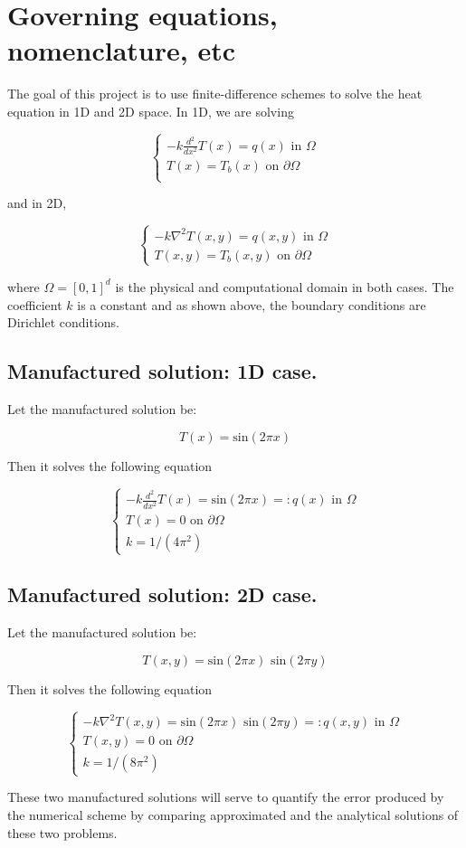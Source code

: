 \section{Governing equations, nomenclature, etc}

The goal of this project is to use finite-difference schemes to solve the heat equation in 1D and 2D space. In 1D, we are solving

$$
\begin{cases}
    -k \frac{d^2}{dx^2}T(x) = q(x) \text{ in } \Omega \\
    T(x) = T_b(x) \text{ on } \partial\Omega \\
\end{cases} 
$$

and in 2D,

$$
\begin{cases}
    -k \nabla^2 T(x,y) = q(x,y) \text{ in } \Omega \\
    T(x,y) = T_b(x,y) \text{ on } \partial\Omega
\end{cases} 
$$

where $\Omega = [0,1]^d$ is the physical and computational domain in both cases. The coefficient $k$ is a constant and as shown above, the boundary conditions are Dirichlet conditions.

\subsection{Manufactured solution: 1D case.}
Let the manufactured solution be: 

\begin{equation*}
    T(x) = \text{sin}(2 \pi x)
\end{equation*}

Then it solves the following equation

$$
\begin{cases}
    -k \frac{d^2}{dx^2}T(x) = \text{sin}(2\pi x) =: q(x)\text{ in } \Omega \\
    T(x) = 0 \text{ on } \partial\Omega \\
    k = 1/(4\pi^2)
\end{cases} 
$$

\subsection{Manufactured solution: 2D case.}
Let the manufactured solution be: 

\begin{equation*}
    T(x,y) = \text{sin}(2 \pi x)\text{ sin}(2 \pi y)
\end{equation*}

Then it solves the following equation

$$
\begin{cases}
    -k \nabla^2 T(x,y) = \text{sin}(2 \pi x)\text{ sin}(2 \pi y) =: q(x,y)\text{ in } \Omega \\
    T(x,y) = 0 \text{ on } \partial\Omega \\
    k = 1/(8\pi^2)
\end{cases} 
$$

These two manufactured solutions will serve to quantify the error produced by the numerical scheme by comparing approximated and the analytical solutions of these two problems. 